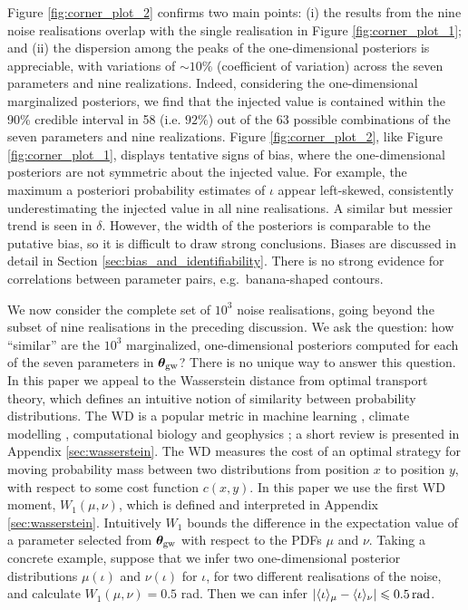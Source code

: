 \documentclass[fleqn,usenatbib,useAMS]{mnras}
\begin{document}
Figure \ref{fig:corner_plot_2} confirms two main points: (i) the results from the nine noise realisations overlap with the single realisation in  Figure \ref{fig:corner_plot_1}; and (ii) the dispersion among the peaks of the one-dimensional posteriors is appreciable, with variations of $\sim10 \%$ (coefficient of variation) across the seven parameters and nine realizations. Indeed, considering the one-dimensional marginalized posteriors, we find that the injected value is contained within the 90\% credible interval in 58 (i.e. $92 \%$) out of the 63 possible combinations of the seven parameters and nine realizations. Figure \ref{fig:corner_plot_2}, like Figure \ref{fig:corner_plot_1}, displays tentative signs of bias, where the one-dimensional posteriors are not symmetric about the injected value. For example, the maximum a posteriori probability estimates of $\iota$ appear left-skewed, consistently underestimating the injected value in all nine realisations. A similar but messier trend is seen in $\delta$. However, the width of the posteriors is comparable to the putative bias, so it is difficult to draw strong conclusions. Biases are discussed in detail in Section \ref{sec:bias_and_identifiability}. There is no strong evidence for correlations between parameter pairs, e.g.\ banana-shaped contours. \newline 


We now consider the complete set of $10^3$ noise realisations, going beyond the subset of nine realisations in the preceding discussion. We ask the question: how ``similar'' are the $10^3$ marginalized, one-dimensional posteriors computed for each of the seven parameters in ${\boldsymbol{\theta}}_{\rm gw}$? There is no unique way to answer this question. In this paper we appeal to the Wasserstein distance \citep[WD;][]{Wasserstein,Villani2009} from optimal transport theory, which defines an intuitive notion of similarity between probability distributions. The WD is a popular metric in machine learning \citep{2017arXiv170107875A}, climate modelling \citep{2022JCli...35.1215P,2023QJRMS.149..843K}, computational biology \citep{GONZALEZDELGADO2023168053} and geophysics \citep{2023GeoRL..5003880M}; a short review is presented in Appendix \ref{sec:wasserstein}. The WD measures the cost of an optimal strategy for moving probability mass between two distributions from position $x$ to position $y$, with respect to some cost function $c(x,y)$. In this paper we use the first WD moment, $W_1(\mu,\nu)$, which is defined and interpreted in Appendix \ref{sec:wasserstein}. Intuitively $W_1$ bounds the difference in the expectation value of a parameter selected from ${\boldsymbol{\theta}}_{\rm gw}$ with respect to the PDFs $\mu$ and $\nu$. Taking a concrete example, suppose that we infer two one-dimensional posterior distributions $\mu(\iota)$ and $\nu(\iota)$ for $\iota$, for two different realisations of the noise, and calculate $W_1(\mu, \nu) =0.5$ rad. Then we can infer $| \langle \iota \rangle_\mu - \langle \iota \rangle_\nu | \leq 0.5 \, {\rm rad}$. \newline 
\end{document}
